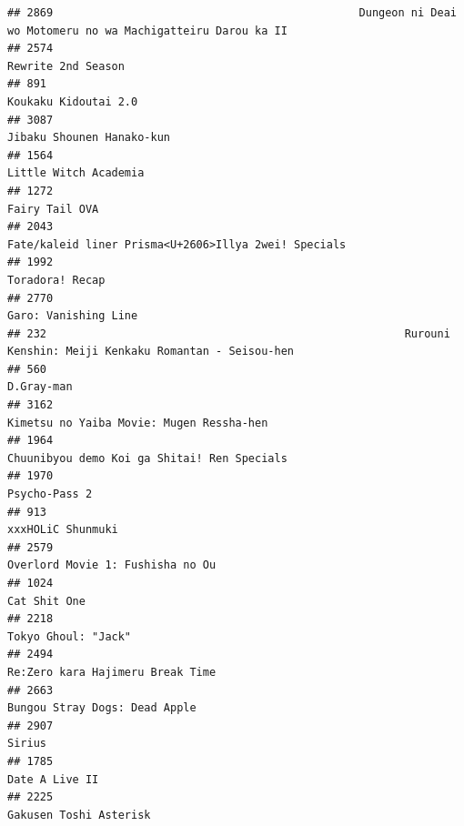 \documentclass[
]{article}
\begin{document}
\begin{verbatim}
## 2869                                               Dungeon ni Deai wo Motomeru no wa Machigatteiru Darou ka II
## 2574                                                                                        Rewrite 2nd Season
## 891                                                                                       Koukaku Kidoutai 2.0
## 3087                                                                                 Jibaku Shounen Hanako-kun
## 1564                                                                                     Little Witch Academia
## 1272                                                                                            Fairy Tail OVA
## 2043                                                      Fate/kaleid liner Prisma<U+2606>Illya 2wei! Specials
## 1992                                                                                           Toradora! Recap
## 2770                                                                                      Garo: Vanishing Line
## 232                                                       Rurouni Kenshin: Meiji Kenkaku Romantan - Seisou-hen
## 560                                                                                                 D.Gray-man
## 3162                                                                  Kimetsu no Yaiba Movie: Mugen Ressha-hen
## 1964                                                               Chuunibyou demo Koi ga Shitai! Ren Specials
## 1970                                                                                             Psycho-Pass 2
## 913                                                                                          xxxHOLiC Shunmuki
## 2579                                                                          Overlord Movie 1: Fushisha no Ou
## 1024                                                                                              Cat Shit One
## 2218                                                                                       Tokyo Ghoul: "Jack"
## 2494                                                                          Re:Zero kara Hajimeru Break Time
## 2663                                                                             Bungou Stray Dogs: Dead Apple
## 2907                                                                                                    Sirius
## 1785                                                                                            Date A Live II
## 2225                                                                                    Gakusen Toshi Asterisk

\end{verbatim}
\end{document}
